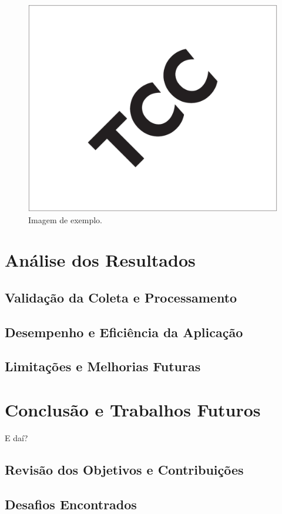 \documentclass[12pt, %
openright, 
oneside, %
a4paper,    %
brazil]{facom-ufu-abntex2}
\begin{document}
\begin{figure}[!ht]
    \centering
	\includegraphics[width=0.55\linewidth]{imagemExemplo.pdf}
	\caption[Isso é o que aparece no sumário]{Imagem de exemplo.}
	\label{fig:graficosVariandoTamanhoRede}
\end{figure}


\chapter{Análise dos Resultados}
\section{Validação da Coleta e Processamento}
\section{Desempenho e Eficiência da Aplicação}
\section{Limitações e Melhorias Futuras}





\chapter{Conclusão e Trabalhos Futuros}
E daí?
\section{Revisão dos Objetivos e Contribuições}
\section{Desafios Encontrados}
\end{document}
